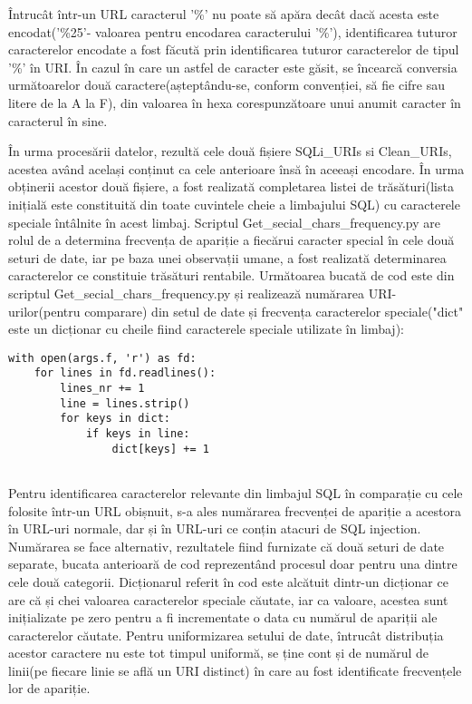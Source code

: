 Întrucât într-un URL caracterul '\%' nu poate să apăra decât dacă acesta este encodat('\%25'- valoarea pentru encodarea caracterului '\%'), identificarea tuturor caracterelor encodate a fost făcută prin identificarea tuturor caracterelor de tipul '\%' în URI. În cazul în care un astfel de caracter este găsit, se încearcă conversia următoarelor două caractere(așteptându-se, conform convenției, să fie cifre sau litere de la A la F), din valoarea în hexa corespunzătoare unui anumit caracter în caracterul în sine. 

  
În urma procesării datelor, rezultă cele două fișiere  SQLi\_URIs si Clean\_URIs,  acestea având același conținut ca cele anterioare însă în aceeași encodare. În urma obținerii acestor două fișiere, a fost realizată completarea listei de trăsături(lista inițială este constituită din toate cuvintele cheie a limbajului SQL) cu caracterele speciale întâlnite în acest limbaj. Scriptul  Get\_secial\_chars\_frequency.py  are rolul de a determina frecvența de apariție a fiecărui caracter special în cele două seturi de date, iar pe baza unei observații umane, a fost realizată determinarea caracterelor ce constituie trăsături rentabile. Următoarea bucată de cod este din scriptul Get\_secial\_chars\_frequency.py  și realizează numărarea URI-urilor(pentru comparare) din setul de date și frecvența caracterelor speciale("dict" este un dicționar cu cheile fiind caracterele speciale utilizate în limbaj): 
\lstset{language=python,frame=single, showstringspaces=false}
\begin{lstlisting}
with open(args.f, 'r') as fd:
    for lines in fd.readlines():
        lines_nr += 1
        line = lines.strip()
        for keys in dict:
            if keys in line:
                dict[keys] += 1
                
\end{lstlisting}

Pentru identificarea caracterelor relevante din limbajul SQL în comparație cu cele folosite într-un URL obișnuit, s-a ales numărarea frecvenței de apariție a acestora în URL-uri normale, dar și în URL-uri ce conțin atacuri de SQL injection. Numărarea se face alternativ, rezultatele fiind furnizate că două seturi de date separate, bucata anterioară de cod reprezentând procesul doar pentru una dintre cele două categorii. Dicționarul referit în cod este alcătuit dintr-un dicționar ce are că și chei valoarea caracterelor speciale căutate, iar ca valoare, acestea sunt inițializate pe zero pentru a fi incrementate o data cu numărul de apariții ale caracterelor căutate. Pentru uniformizarea setului de date, întrucât distribuția acestor caractere nu este tot timpul uniformă, se ține cont și de numărul de linii(pe fiecare linie se află un URI distinct) în care au fost identificate frecvențele lor de apariție. 


